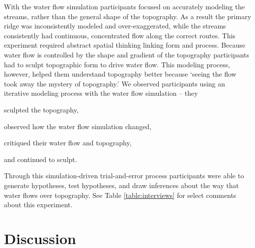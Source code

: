 \documentclass[Afour,sagev,times]{sagej} %
\begin{document}
With the water flow simulation
participants focused on accurately modeling the streams, 
rather than the general shape of the topography. 
As a result the primary ridge was 
inconsistently modeled and over-exaggerated,
while the streams consistently 
had continuous, concentrated flow 
along the correct routes.
This experiment required abstract spatial thinking linking form and process. 
Because water flow is controlled by the shape and gradient of the topography
participants had to sculpt topographic form to drive water flow. 
This modeling process, however, helped them understand topography better 
because `seeing the flow took away the mystery of topography.'
%
We observed participants using an iterative modeling process 
with the water flow simulation -- 
they 
\begin{enumerate*}[label=\alph*),font=\itshape]
\item sculpted the topography, 
\item observed how the water flow simulation changed, 
\item critiqued their water flow and topography, 
\item and continued to sculpt.
\end{enumerate*}
%
Through this simulation-driven trial-and-error process 
participants were able 
to generate hypotheses, test hypotheses, and draw inferences 
about the way that water flows over topography. 
See Table \ref{table:interviews} for select comments about this experiment.





\section{Discussion}





\end{document}
